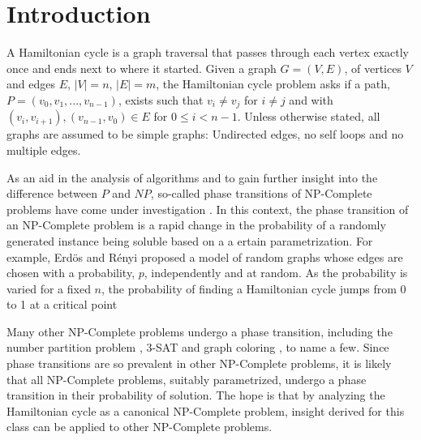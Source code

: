\documentclass[twoside,11pt]{article}
\begin{document}
\section{Introduction}


A Hamiltonian cycle is
a graph traversal that passes through each vertex exactly once and ends
next to where it started.
Given a graph $G = (V, E)$, of vertices $V$ and
edges $E$, $|V|=n$, $|E|=m$, the Hamiltonian cycle problem
asks if a path, $P = (v_0, v_1, ... , v_{n-1})$, exists such that
$v_i \ne v_j$ for $i \ne j$ and with $(v_i, v_{i+1}), (v_{n-1}, v_0) \in E$ for
$0 \le i < n-1$.
Unless otherwise stated, all graphs are assumed to be simple graphs: Undirected edges,
no self loops and no multiple edges.


As an aid in the analysis of algorithms and to gain further insight into the difference
between $P$ and $NP$, so-called phase transitions of NP-Complete 
problems have come under investigation \cite{selman,gent,hartmann_weigt_2001,hartmann_weigt,martin,monasson}.
In this context, the phase transition of an NP-Complete problem is a rapid change
in the probability of a randomly generated instance being soluble based on a a ertain
parametrization.  For example,
Erd\"os and R\'enyi \citeyear{erdos} proposed a model of random graphs
whose edges are chosen with a probability, $p$, independently and at random.  As the probability
is varied for a fixed $n$, the probability of finding a Hamiltonian cycle jumps from 0 to 1 at
a critical point \cite{komlos,posa}

Many other NP-Complete problems undergo a phase transition, 
including the number partition problem \cite{gent,mertens,borgs_pt}, 3-SAT \cite{selman}
and graph coloring \cite{cheeseman}, to name a few.  
Since phase transitions are so prevalent in other NP-Complete problems, it is likely that
all NP-Complete problems, suitably parametrized, undergo a phase transition in their probability 
of solution.  The hope is that by analyzing the Hamiltonian cycle as a canonical NP-Complete problem,
insight derived for this class can be applied to other NP-Complete problems.
\end{document}

